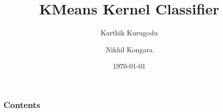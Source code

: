 \documentclass{beamer}
\title[KMeans Kernel Classifier]{KMeans Kernel Classifier} %
\author{Karthik Kurugodu \and Nikhil Kongara} %
\institute[] %
{
IIT Hyderabad \\ %
\medskip
\textit{} %
}
\date{\today} %
\begin{document}
\begin{frame}
\titlepage %
\end{frame}

\begin{frame}
\frametitle{Contents} %
\tableofcontents %
\end{frame}


\end{document}
